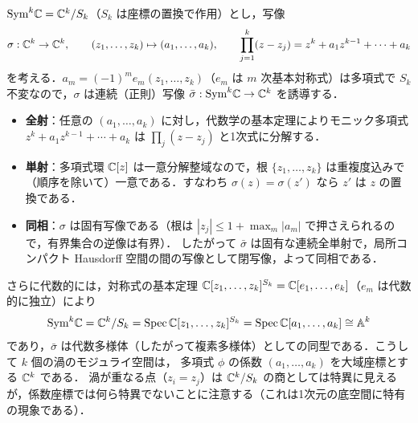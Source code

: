 $\mathrm{Sym}^k\mathbb{C}=\mathbb{C}^k/S_k$（$S_k$ は座標の置換で作用）とし，写像
\begin{equation*}
  \sigma:\mathbb{C}^k\to\mathbb{C}^k,\qquad (z_1,\dots,z_k)\mapsto(a_1,\dots,a_k),\qquad \prod_{j=1}^k(z-z_j) = z^k+a_1z^{k-1}+\cdots+a_k
\end{equation*}
を考える．$a_m=(-1)^me_m(z_1,\dots,z_k)$（$e_m$ は $m$ 次基本対称式）は多項式で $S_k$ 不変なので，$\sigma$ は連続（正則）写像
$\bar\sigma:\mathrm{Sym}^k\mathbb{C}\to\mathbb{C}^k$ を誘導する．
\begin{itemize}
  \item \textbf{全射}：任意の $(a_1,\dots,a_k)$ に対し，代数学の基本定理によりモニック多項式 $z^k+a_1z^{k-1}+\cdots+a_k$ は $\prod_j(z-z_j)$ と1次式に分解する．
  \item \textbf{単射}：多項式環 $\mathbb{C}[z]$ は一意分解整域なので，根 $\{z_1,\dots,z_k\}$ は重複度込みで（順序を除いて）一意である．すなわち $\sigma(z)=\sigma(z')$ なら $z'$ は $z$ の置換である．
  \item \textbf{同相}：$\sigma$ は固有写像である（根は $|z_j|\leq1+\max_m|a_m|$ で押さえられるので，有界集合の逆像は有界）．
  したがって $\bar\sigma$ は固有な連続全単射で，局所コンパクト Hausdorff 空間の間の写像として閉写像，よって同相である．
\end{itemize}
さらに代数的には，対称式の基本定理 $\mathbb{C}[z_1,\dots,z_k]^{S_k}=\mathbb{C}[e_1,\dots,e_k]$（$e_m$ は代数的に独立）により
\begin{equation*}
  \mathrm{Sym}^k\mathbb{C} = \mathbb{C}^k/S_k = \operatorname{Spec}\mathbb{C}[z_1,\dots,z_k]^{S_k} = \operatorname{Spec}\mathbb{C}[a_1,\dots,a_k]\cong\mathbb{A}^k
\end{equation*}
であり，$\bar\sigma$ は代数多様体（したがって複素多様体）としての同型である．こうして $k$ 個の渦のモジュライ空間は，
多項式 $\phi$ の係数 $(a_1,\dots,a_k)$ を大域座標とする $\mathbb{C}^k$ である．
渦が重なる点（$z_i=z_j$）は $\mathbb{C}^k/S_k$ の商としては特異に見えるが，係数座標では何ら特異でないことに注意する（これは1次元の底空間に特有の現象である）．
